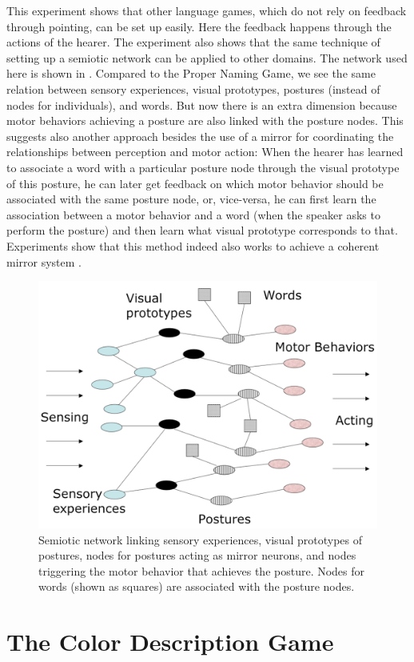 This experiment shows that other language games, which do not rely on feedback through pointing, can be set up easily. 
Here the feedback happens through the actions of the hearer. The experiment also shows
that the same technique of setting up a semiotic network can be applied to other domains. 
The network used here is shown in . Compared to the Proper Naming Game, we see the same relation between 
sensory experiences, visual prototypes, postures (instead of nodes for individuals), 
and words. But now there is an extra dimension because motor behaviors 
achieving a posture are also linked with the posture nodes. This suggests also another approach besides the use of a mirror 
for coordinating the relationships between perception and motor action: When the hearer has learned to associate a word with a particular
posture node through the visual prototype of this posture, he can later get feedback on which motor behavior should be 
associated with the same posture node, or, vice-versa, he can first learn the association between a motor behavior and 
a word (when the speaker asks to perform the posture) and then learn what visual prototype corresponds to that. 
Experiments show that this method indeed also works to achieve a coherent mirror system \cite{Steels:2008}.

\begin{figure}
\centerline{\includegraphics[width=0.6\linewidth]{chap11/figs/network}}
\caption{\footnotesize \label{network} Semiotic network linking sensory experiences, visual prototypes of postures, nodes for postures acting as mirror neurons, and nodes triggering the motor behavior that achieves the posture. Nodes for words (shown as squares) 
are associated with the posture nodes.}
\end{figure}

\section{The Color Description Game}

